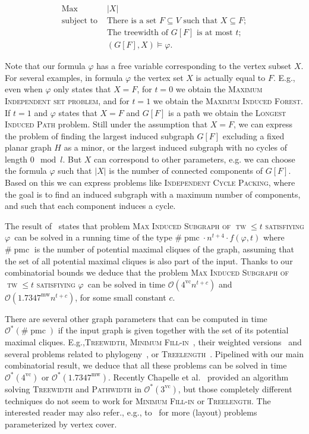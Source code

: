 \documentclass{llncs}
\newcommand{\cO}{\mathcal{O}}
\newcommand{\vc}{\operatorname{vc}}
\newcommand{\tw}{\operatorname{tw}}
\newcommand{\mw}{\operatorname{mw}}
\newcommand{\spmc}{\#\operatorname{pmc}}
\newcommand{\pmcb}{1.7347}
\newcommand{\msphit}{\textsc{Max\- Induced\- Subgraph\- of\- $\tw\leq t$\- satisfiying\- $\varphi$}}
\newcommand{\npmc}{4}
\begin{document}
\vspace{-0.2cm}
\begin{equation}\label{eq:opt_phi} 
\begin{array}{ll}
\mbox{Max}  &  |X|   \\
\mbox{subject to } &  \mbox{There is a set }   F\subseteq V    \mbox{ such that }  X\subseteq F;       \\
 &  \mbox{The treewidth of   }  G[F]    \mbox{ is at most }  t ;     \\
 &  (G[F],X)\models\varphi.  
\end{array}
\end{equation}
\vspace{-0.2cm}

Note that our formula $\varphi$ has a free variable corresponding to the vertex subset $X$. 
 For several examples, in  formula $\varphi$ the vertex set $X$ is actually equal to $F$. E.g., even when $\varphi$ only states that $X = F$, for $t=0$ we obtain the \textsc{Maximum Independent set problem}, and for $t=1$ we obtain the \textsc{Maximum Induced Forest}. If $t=1$ and  $\varphi$ states that $X=F$ and $G[F]$ is a path we obtain the \textsc{Longest Induced Path} problem. Still under the assumption that $X=F$, we can express the problem of finding the largest induced subgraph $G[F]$ excluding a fixed planar graph $H$ as a minor, or the largest induced subgraph with no cycles of length $0 \mod l$. But $X$ can correspond to other parameters, e.g. we can choose the formula $\varphi$ such that $|X|$ is the number of connected components of $G[F]$. Based on this we can express problems like \textsc{Independent Cycle Packing}, where the goal is to find an induced subgraph with a maximum number of components, and such that each component induces a cycle. 


The result of~\cite{FoToVi14} states that problem \msphit\ can be solved in a running time of the type $\spmc \cdot n^{t+4} \cdot f(\varphi,t)$ where $\spmc$ is the number of potential maximal cliques of the graph, assuming that the set of all potential maximal cliques is also part of the input. 
Thanks to our combinatorial bounds we deduce that the problem \msphit\  can be solved in time $\cO(\npmc^{\vc}n^{t+c})$ and  $\cO(\pmcb^{\mw}n^{t+c})$, for some small constant $c$.

There are several other graph parameters that can be computed in time $\cO^*(\spmc)$ if the input graph is given together with the set of its potential maximal cliques. E.g.,\textsc{Treewidth}, \textsc{Minimum Fill-in}~\cite{FKTV08}, their weighted versions~\cite{BoFo05,Gysel13} and several problems related to phylogeny~\cite{Gysel13},  or  \textsc{Treelength}~\cite{Lokshtanov10}. Pipelined with our main combinatorial result, we deduce that all these problems can be solved in time $\cO^*(\npmc^{\vc})$ or $\cO^*(\pmcb^{\mw})$. Recently Chapelle et al.~\cite{CLTV13} provided an algorithm solving \textsc{Treewidth} and \textsc{Pathwidth} in  $\cO^*(3^{\vc})$, but those completely different techniques do not seem to work for \textsc{Minimum Fill-in} or \textsc{Treelength}. The interested reader may also refer., e.g., to~\cite{CLP+14,FLM+08} for more (layout) problems parameterized by vertex cover.
\end{document}
